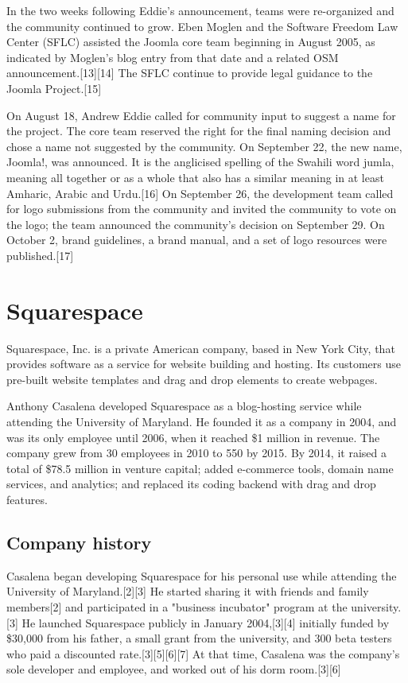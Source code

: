 \documentclass[12pt]{article}
\begin{document}
In the two weeks following Eddie's announcement, teams were re-organized and the community continued to grow. Eben Moglen and the Software Freedom Law Center (SFLC) assisted the Joomla core team beginning in August 2005, as indicated by Moglen's blog entry from that date and a related OSM announcement.[13][14] The SFLC continue to provide legal guidance to the Joomla Project.[15]

On August 18, Andrew Eddie called for community input to suggest a name for the project. The core team reserved the right for the final naming decision and chose a name not suggested by the community. On September 22, the new name, Joomla!, was announced. It is the anglicised spelling of the Swahili word jumla, meaning all together or as a whole that also has a similar meaning in at least Amharic, Arabic and Urdu.[16] On September 26, the development team called for logo submissions from the community and invited the community to vote on the logo; the team announced the community's decision on September 29. On October 2, brand guidelines, a brand manual, and a set of logo resources were published.[17] 



\newpage

\section{Squarespace}


Squarespace, Inc. is a private American company, based in New York City, that provides software as a service for website building and hosting. Its customers use pre-built website templates and drag and drop elements to create webpages.

Anthony Casalena developed Squarespace as a blog-hosting service while attending the University of Maryland. He founded it as a company in 2004, and was its only employee until 2006, when it reached \$1 million in revenue. The company grew from 30 employees in 2010 to 550 by 2015. By 2014, it raised a total of \$78.5 million in venture capital; added e-commerce tools, domain name services, and analytics; and replaced its coding backend with drag and drop features. 



\subsection{Company history}

Casalena began developing Squarespace for his personal use while attending the University of Maryland.[2][3] He started sharing it with friends and family members[2] and participated in a "business incubator" program at the university.[3] He launched Squarespace publicly in January 2004,[3][4] initially funded by \$30,000 from his father, a small grant from the university, and 300 beta testers who paid a discounted rate.[3][5][6][7] At that time, Casalena was the company's sole developer and employee, and worked out of his dorm room.[3][6]
\end{document}
